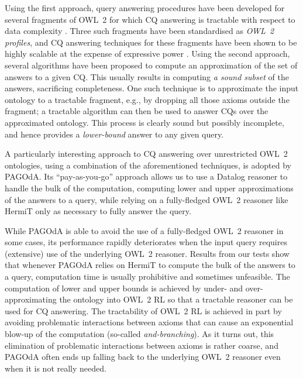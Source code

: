 \documentclass[runningheads]{llncs}
\newcommand{\pagoda}{\mbox{PAGOdA}\xspace}
\newcommand{\hermit}{\mbox{HermiT}\xspace}
\newcommand{\datalog}{\mbox{Datalog}\xspace}
\begin{document}
Using the first approach, query answering procedures have been developed for several fragments of OWL~2 for which CQ answering is tractable with respect to data complexity \cite{calvanese2006}.
Three such fragments have been standardised as \emph{OWL~2 profiles}, and CQ answering techniques
for these fragments have been shown to be highly scalable at the expense of expressive power \cite{calvanese2007,kontchakov2010,lutz2009,ren2016,stefanoni2013,stefanoni2014}.
Using the second approach, several algorithms have been proposed to compute an approximation of the set of answers to a given CQ.
This usually results in computing \emph{a sound subset} of the answers, sacrificing completeness.
One such technique is to approximate the input ontology to a tractable fragment, e.g., by dropping all those axioms outside the fragment; a tractable algorithm can then be used to answer CQs over the approximated ontology.
This process is clearly sound but possibly incomplete, and hence provides a \emph{lower-bound} answer to any given query.

A particularly interesting approach to CQ answering over unrestricted OWL~2 ontologies, using a combination of the aforementioned techniques, is adopted by \pagoda\cite{zhou2015}.
Its ``pay-as-you-go'' approach allows us to use a \datalog reasoner to handle the bulk of the computation, computing lower and upper approximations of the answers to a query, while relying on a fully-fledged OWL~2 reasoner like \hermit only as necessary to fully answer the query.

While \pagoda is able to avoid the use of a fully-fledged OWL~2 reasoner in some cases, its performance rapidly deteriorates when the input query requires (extensive) use of the underlying OWL~2 reasoner.
Results from our tests show that whenever \pagoda relies on \hermit to compute the bulk of the answers to a query, computation time is usually prohibitive and sometimes unfeasible.
The computation of lower and upper bounds is achieved by under- and over-approximating the ontology into OWL~2 RL so that a tractable reasoner can be used for CQ answering. The tractability of OWL~2 RL is achieved in part by avoiding problematic interactions between axioms that can cause an exponential blow-up of the computation (so-called \emph{and-branching}).
As it turns out, this elimination of problematic interactions between axioms is rather coarse, and \pagoda often ends up falling back to the underlying OWL~2 reasoner even when it is not really needed.
\end{document}
